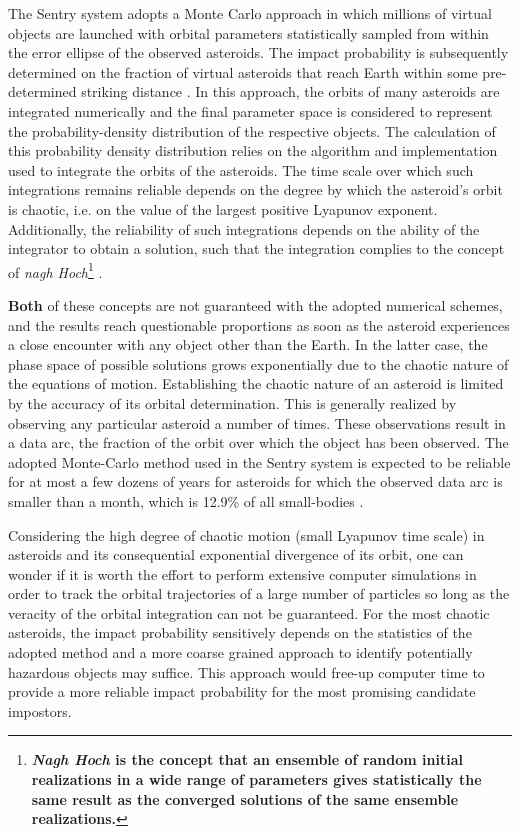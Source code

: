 \documentclass{aa}
\begin{document}
The Sentry system adopts a Monte Carlo approach in which millions of
virtual objects are launched with orbital parameters statistically
sampled from within the error ellipse of the observed asteroids. The
impact probability is subsequently determined on the fraction of
virtual asteroids that reach Earth within some pre-determined striking
distance \citep{milani2002}. In this approach, the orbits of many
asteroids are integrated numerically and the final parameter space is
considered to represent the probability-density distribution of the
respective objects. The calculation of this probability density
distribution relies on the algorithm and implementation used to
integrate the orbits of the asteroids.  The time scale over which such
integrations remains reliable depends on the degree by which the
asteroid's orbit is chaotic, i.e. on the value of the largest positive
Lyapunov exponent.  Additionally, the reliability of such integrations
depends on the ability of the integrator to obtain a solution, such that the integration complies to the concept of {\em
  nagh Hoch}\footnote{\textbf{\textit{Nagh Hoch} is the concept that an ensemble of random initial realizations in a wide range of parameters gives statistically the same result as the converged solutions of the same ensemble realizations.}}
\citep{PORTEGIESZWART2018160}.  
\par
\textbf{Both} of these concepts are not
guaranteed with the adopted numerical schemes, and the results reach
questionable proportions as soon as the asteroid experiences a close
encounter with any object other than the Earth. In the latter case,
the phase space of possible solutions grows exponentially due to the
chaotic nature of the equations of motion.  Establishing the chaotic
nature of an asteroid is limited by the accuracy of its orbital
determination. This is generally realized by observing any particular
asteroid a number of times. These observations result in a data arc,
the fraction of the orbit over which the object has been observed.
The adopted Monte-Carlo method used in the Sentry system is expected
to be reliable for at most a few dozens of years
\citep{HorizonsManual} for asteroids for which the observed data arc
is smaller than a month, which is 12.9\% of all small-bodies \citep{dastcom5}.

Considering the high degree of chaotic motion (small Lyapunov time
scale) in asteroids and its consequential exponential divergence of
its orbit, one can wonder if it is worth the effort to perform
extensive computer simulations in order to track the orbital
trajectories of a large number of particles so long as the veracity of
the orbital integration can not be guaranteed. For the most chaotic
asteroids, the impact probability sensitively depends on the
statistics of the adopted method and a more coarse grained approach to
identify potentially hazardous objects may suffice. This approach
would free-up computer time to provide a more reliable impact probability for the most promising candidate impostors. 
\end{document}
